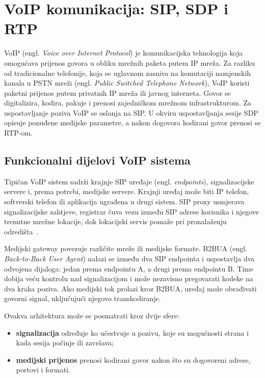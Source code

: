 \chapter{VoIP komunikacija: SIP, SDP i RTP}
\label{ch:osnove-voip}

VoIP (engl. \emph{Voice over Internet Protocol}) je komunikacijska tehnologija koja omogućava prijenos govora u obliku mrežnih paketa putem IP mreža. Za razliku od tradicionalne telefonije, koja se uglavnom zasniva na komutaciji namjenskih kanala u PSTN mreži (engl. \emph{Public Switched Telephone Network}), VoIP koristi paketni prijenos putem privatnih IP mreža ili javnog interneta. Govor se digitalizira, kodira, pakuje i prenosi zajedničkom mrežnom infrastrukturom. Za uspostavljanje poziva VoIP se oslanja na SIP. U okviru uspostavljanja sesije SDP opisuje ponuđene medijske parametre, a nakon dogovora kodirani govor prenosi se RTP-om.


\section{Funkcionalni dijelovi VoIP sistema}

Tipičan VoIP sistem sadrži krajnje SIP uređaje (engl. \emph{endpoints}), signalizacijske servere i, prema potrebi, medijske servere. Krajnji uređaj može biti IP telefon, softverski telefon ili aplikacija ugrađena u drugi sistem. SIP proxy usmjerava signalizacijske zahtjeve, registrar čuva vezu između SIP adrese korisnika i njegove trenutne mrežne lokacije, dok lokacijski servis pomaže pri pronalaženju odredišta~\cite{rfc3261}.

Medijski gateway povezuje različite mreže ili medijske formate. B2BUA (engl. \emph{Back-to-Back User Agent}) nalazi se između dva SIP endpointa i uspostavlja dva odvojena dijaloga: jedan prema endpointu A, a drugi prema endpointu B. Time dobija veću kontrolu nad signalizacijom i može nezavisno pregovarati kodeke na dva kraka poziva. Ako medijski tok prolazi kroz B2BUA, uređaj može obrađivati govorni signal, uključujući njegovo transkodiranje.

Ovakva arhitektura može se posmatrati kroz dvije sfere:

\begin{itemize}
    \item \textbf{signalizacija} određuje ko učestvuje u pozivu, koje su mogućnosti strana i kada sesija počinje ili završava;
    \item \textbf{medijski prijenos} prenosi kodirani govor nakon što su dogovoreni adrese, portovi i formati.
\end{itemize}

